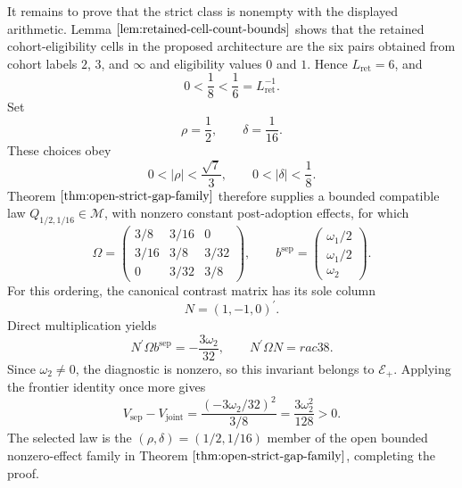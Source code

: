 It remains to prove that the strict class is nonempty with the displayed arithmetic. Lemma \(\ref{lem:retained-cell-count-bounds}\) shows that the retained cohort-eligibility cells in the proposed architecture are the six pairs obtained from cohort labels \(2\), \(3\), and \(\infty\) and eligibility values \(0\) and \(1\). Hence \(L_{\mathrm{ret}}=6\), and
\[
 0<\frac18<\frac16=L_{\mathrm{ret}}^{-1}.
\]
Set
\[
 \rho=\frac12,
 \qquad
 \delta=\frac1{16}.
\]
These choices obey
\[
 0<|\rho|<\frac{\sqrt7}{3},
 \qquad
 0<|\delta|<\frac18.
\]
Theorem \(\ref{thm:open-strict-gap-family}\) therefore supplies a bounded compatible law \(Q_{1/2,1/16}\in\mathcal M\), with nonzero constant post-adoption effects, for which
\[
 \Omega=
 \begin{pmatrix}
 3/8&3/16&0\\
 3/16&3/8&3/32\\
 0&3/32&3/8
 \end{pmatrix},
 \qquad
 b^{\mathrm{sep}}=
 \begin{pmatrix}
 \omega_1/2\\
 \omega_1/2\\
 \omega_2
 \end{pmatrix}.
\]
For this ordering, the canonical contrast matrix has its sole column
\[
 N=(1,-1,0)^{\prime}.
\]
Direct multiplication yields
\[
 N^{\prime}\Omega b^{\mathrm{sep}}=-\frac{3\omega_2}{32},
 \qquad
 N^{\prime}\Omega N=rac38.
\]
Since \(\omega_2\ne0\), the diagnostic is nonzero, so this invariant belongs to \(\mathscr E_+\). Applying the frontier identity once more gives
\[
 V_{\mathrm{sep}}-V_{\mathrm{joint}}
 =\frac{(-3\omega_2/32)^2}{3/8}
 =\frac{3\omega_2^2}{128}>0.
\]
The selected law is the \((\rho,\delta)=(1/2,1/16)\) member of the open bounded nonzero-effect family in Theorem \(\ref{thm:open-strict-gap-family}\), completing the proof.